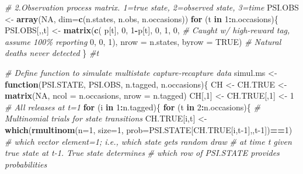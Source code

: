 \documentclass[
]{krantz}
\makeatletter
\newenvironment{Shaded}{\begin{snugshade}}{\end{snugshade}}
\newcommand{\AttributeTok}[1]{\textcolor[rgb]{0.27,0.27,0.27}{#1}}
\newcommand{\CommentTok}[1]{\textcolor[rgb]{0.37,0.37,0.37}{\textit{#1}}}
\newcommand{\ConstantTok}[1]{\textcolor[rgb]{0.37,0.37,0.37}{#1}}
\newcommand{\ControlFlowTok}[1]{\textcolor[rgb]{0.27,0.27,0.27}{\textbf{#1}}}
\newcommand{\DecValTok}[1]{\textcolor[rgb]{0.06,0.06,0.06}{#1}}
\newcommand{\FunctionTok}[1]{\textcolor[rgb]{0.27,0.27,0.27}{\textbf{#1}}}
\newcommand{\NormalTok}[1]{#1}
\newcommand{\OtherTok}[1]{\textcolor[rgb]{0.37,0.37,0.37}{#1}}
\newcommand{\SpecialCharTok}[1]{\textcolor[rgb]{0.43,0.43,0.43}{\textbf{#1}}}
\newenvironment{kframe}{%
\medskip{}
\setlength{\fboxsep}{.8em}
 \def\at@end@of@kframe{}%
 \ifinner\ifhmode%
  \def\at@end@of@kframe{\end{minipage}}%
  \begin{minipage}{\columnwidth}%
 \fi\fi%
 \def\FrameCommand##1{\hskip\@totalleftmargin \hskip-\fboxsep
 \colorbox{shadecolor}{##1}\hskip-\fboxsep
     \hskip-\linewidth \hskip-\@totalleftmargin \hskip\columnwidth}%
 \MakeFramed {\advance\hsize-\width
   \@totalleftmargin\z@ \linewidth\hsize
   \@setminipage}}%
 {\par\unskip\endMakeFramed%
 \at@end@of@kframe}
\renewenvironment{Shaded}{\begin{kframe}}{\end{kframe}}
\makeatother
\begin{document}
\begin{Shaded}
\begin{Highlighting}[]
\CommentTok{\# 2.Observation process matrix.  1=true state, 2=observed state, 3=time}
\NormalTok{PSI.OBS }\OtherTok{\textless{}{-}} \FunctionTok{array}\NormalTok{(}\ConstantTok{NA}\NormalTok{, }\AttributeTok{dim=}\FunctionTok{c}\NormalTok{(n.states, n.obs, n.occasions))}
   \ControlFlowTok{for}\NormalTok{ (t }\ControlFlowTok{in} \DecValTok{1}\SpecialCharTok{:}\NormalTok{n.occasions)\{}
\NormalTok{      PSI.OBS[,,t] }\OtherTok{\textless{}{-}} \FunctionTok{matrix}\NormalTok{(}\FunctionTok{c}\NormalTok{(}
\NormalTok{      p[t], }\DecValTok{0}\NormalTok{, }\DecValTok{1}\SpecialCharTok{{-}}\NormalTok{p[t],}
      \DecValTok{0}\NormalTok{,  }\DecValTok{1}\NormalTok{, }\DecValTok{0}\NormalTok{,  }\CommentTok{\# Caught w/ high{-}reward tag, assume 100\% reporting}
      \DecValTok{0}\NormalTok{, }\DecValTok{0}\NormalTok{, }\DecValTok{1}\NormalTok{), }\AttributeTok{nrow =}\NormalTok{ n.states, }\AttributeTok{byrow =} \ConstantTok{TRUE}\NormalTok{)  }
        \CommentTok{\# Natural deaths never detected}
\NormalTok{      \} }\CommentTok{\#t}

\CommentTok{\# Define function to simulate multistate capture{-}recapture data}
\NormalTok{simul.ms }\OtherTok{\textless{}{-}} \ControlFlowTok{function}\NormalTok{(PSI.STATE, PSI.OBS, n.tagged, n.occasions)\{}
\NormalTok{   CH }\OtherTok{\textless{}{-}}\NormalTok{ CH.TRUE }\OtherTok{\textless{}{-}} \FunctionTok{matrix}\NormalTok{(}\ConstantTok{NA}\NormalTok{, }\AttributeTok{ncol =}\NormalTok{ n.occasions, }\AttributeTok{nrow =}\NormalTok{ n.tagged)}
\NormalTok{   CH[,}\DecValTok{1}\NormalTok{] }\OtherTok{\textless{}{-}}\NormalTok{ CH.TRUE[,}\DecValTok{1}\NormalTok{] }\OtherTok{\textless{}{-}} \DecValTok{1} \CommentTok{\# All releases at t=1}
   \ControlFlowTok{for}\NormalTok{ (i }\ControlFlowTok{in} \DecValTok{1}\SpecialCharTok{:}\NormalTok{n.tagged)\{}
     \ControlFlowTok{for}\NormalTok{ (t }\ControlFlowTok{in} \DecValTok{2}\SpecialCharTok{:}\NormalTok{n.occasions)\{}
         \CommentTok{\# Multinomial trials for state transitions}
\NormalTok{         CH.TRUE[i,t] }\OtherTok{\textless{}{-}} \FunctionTok{which}\NormalTok{(}\FunctionTok{rmultinom}\NormalTok{(}\AttributeTok{n=}\DecValTok{1}\NormalTok{, }\AttributeTok{size=}\DecValTok{1}\NormalTok{,}
                            \AttributeTok{prob=}\NormalTok{PSI.STATE[CH.TRUE[i,t}\DecValTok{{-}1}\NormalTok{],,t}\DecValTok{{-}1}\NormalTok{])}\SpecialCharTok{==}\DecValTok{1}\NormalTok{)}
         \CommentTok{\# which vector element=1; i.e., which state gets random draw}
         \CommentTok{\# at time t given true state at t{-}1. True state determines}
         \CommentTok{\# which row of PSI.STATE provides probabilities}


\end{Highlighting}
\end{Shaded}
\end{document}
